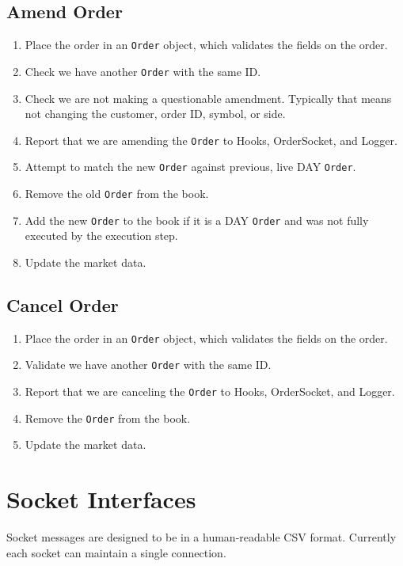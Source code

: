 \documentclass[Letter]{article}
\begin{document}
\subsection{Amend Order}

\begin{enumerate}
    \item Place the order in an \texttt{Order} object, which validates
    the fields on the order.
    \item Check we have another \texttt{Order} with the same ID.
    \item Check we are not making a questionable amendment.  Typically
    that means not changing the customer, order ID, symbol, or
    side.
    \item Report that we are amending the \texttt{Order} to Hooks,
    OrderSocket, and Logger.
    \item Attempt to match the new \texttt{Order} against previous,
    live DAY \texttt{Order}.
    \item Remove the old \texttt{Order} from the book.
    \item Add the new \texttt{Order} to the book if it is a DAY
    \texttt{Order} and was not fully executed by the execution step.
    \item Update the market data.
\end{enumerate}

\subsection{Cancel Order}

\begin{enumerate}
    \item Place the order in an \texttt{Order} object, which validates
    the fields on the order.
    \item Validate we have another \texttt{Order} with the same ID.
    \item Report that we are canceling the \texttt{Order} to Hooks,
    OrderSocket, and Logger.
    \item Remove the \texttt{Order} from the book.
    \item Update the market data.
\end{enumerate}

\newpage
\section{Socket Interfaces}

Socket messages are designed to be in a human-readable CSV format.
Currently each socket can maintain a single connection.
\end{document}
